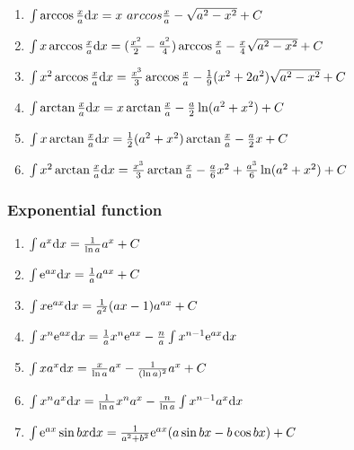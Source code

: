 \begin{tiny}
\begin {enumerate}[noitemsep]
\item $ \int \arccos \frac{x}{a} \md x= x \ arccos \frac{x}{a} - \sqrt{a^2-x^2} +C $

\item $ \int x \arccos \frac{x}{a} \mathrm{d} x= (\frac{x^2}{2}-\frac{a^2}{4})\arccos \frac{x}{a} - \frac{x}{4} \sqrt{a^2-x^2}+C $

\item $ \int x^2 \arccos \frac{x}{a}\mathrm{d} x= \frac{x^3}{3}\arccos \frac{x}{a} - \frac{1}{9}(x^2+2a^2)\sqrt{a^2-x^2}+C$

\item $ \int \arctan \frac{x}{a} \mathrm{d} x=x \arctan \frac{x}{a}-\frac{a}{2}\ln (a^2+x^2)+C $

\item $ \int x\arctan \frac{x}{a} \mathrm{d} x = \frac{1}{2}(a^2+x^2)\arctan \frac{x}{a} -\frac{a}{2}x+C $

\item $ \int x^2 \arctan \frac{x}{a} \mathrm{d} x= \frac{x^3}{3} \arctan \frac{x}{a} - \frac{a}{6}x^2 + \frac{a^3}{6} \ln (a^2+x^2)+C $

\end {enumerate}

\subsubsection{Exponential function}

\begin{enumerate}[noitemsep]

\item $ \int a^x \mathrm{d} x= \frac{1}{\ln a} a^x + C$

\item $ \int \mathrm{e} ^{ax}\mathrm{d} x=\frac{1}{a}a^{ax}+C $ 

\item $ \int x \mathrm{e}  ^ {ax} \mathrm{d} x=\frac{1}{a^2}(ax-1)a^{ax} +C $

\item $ \int x^n \mathrm{e} ^{ax} \mathrm{d} x=\frac{1}{a}x^n \mathrm{e} ^{ax}-\frac{n}{a} \int x^{n-1} \mathrm{e} ^ {ax} \mathrm{d} x $

\item $ \int x a^x \mathrm{d} x = \frac{x}{\ln a}a^x-\frac{1}{(\ln a)^2}a^x+C $

\item $ \int x^n a^x \mathrm{d} x= \frac{1}{\ln a}x^n a^x-\frac{n}{\ln a}\int x^{n-1}a^x \mathrm{d} x $

\item $ \int \mathrm{e} ^{ax} \sin bx \mathrm{d} x = \frac{1}{a^2+b^2}\mathrm{e} ^{ax}(a \sin bx - b \cos bx)+C $


\end{enumerate}
\end{tiny}

